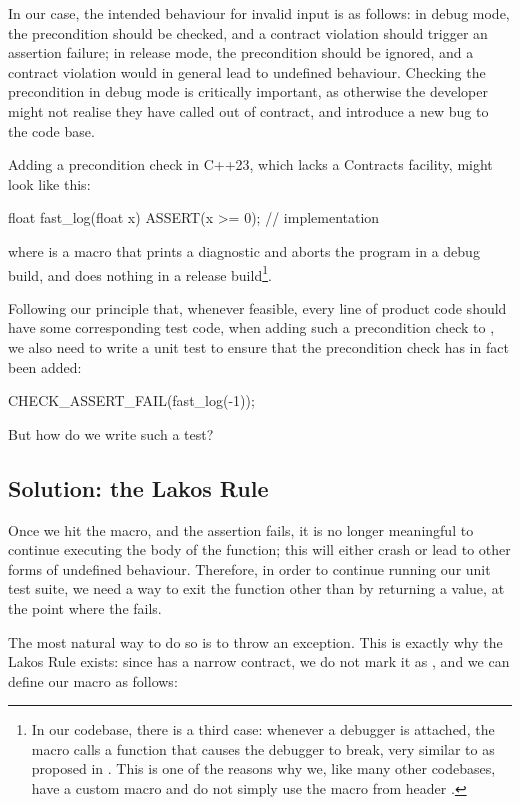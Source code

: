 In our case, the intended behaviour for invalid input is as follows: in debug mode, the precondition  should be checked, and a contract violation should trigger an assertion failure; in release mode, the precondition should be ignored, and a contract violation would in general lead to undefined behaviour. Checking the precondition in debug mode is critically important, as otherwise the developer might not realise they have called  out of contract, and introduce a new bug to the code base.

Adding a precondition check in C++23, which lacks a Contracts facility, might look like this:
\begin{codeblock}
float fast_log(float x) {
  ASSERT(x >= 0);
  // implementation
}
\end{codeblock}
where  is a macro that prints a diagnostic and aborts the program in a debug build, and does nothing in a release build\footnote{In our codebase, there is a third case: whenever a debugger is attached, the macro calls a function that causes the debugger to break, very similar to  as proposed in \cite{P2514R0}. This is one of the reasons why we, like many other codebases, have a custom  macro and do not simply use the  macro from header .}.

Following our principle that, whenever feasible, every line of product code should have some corresponding test code, when adding such a precondition check to , we also need to write a unit test to ensure that the precondition check has in fact been added:
\begin{codeblock}
CHECK_ASSERT_FAIL(fast_log(-1));
\end{codeblock}
But how do we write such a test?

\subsection{Solution: the Lakos Rule}
Once we hit the  macro, and the assertion fails, it is no longer meaningful to continue executing the body of the function; this will either crash or lead to other forms of undefined behaviour. Therefore, in order to continue running our unit test suite, we need a way to exit the function other than by returning a value, at the point where the  fails. 

The most natural way to do so is to throw an exception. This is exactly why the Lakos Rule exists: since  has a narrow contract, we do not mark it as , and we can define our  macro as follows:


